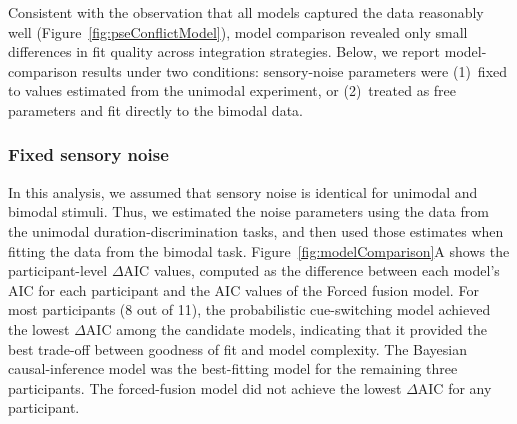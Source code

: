 \documentclass{jov}
\begin{document}



Consistent with the observation that all models captured the data reasonably well (Figure~\ref{fig:pseConflictModel}), model comparison revealed only small differences in fit quality across integration strategies. Below, we report model-comparison results under two conditions: sensory-noise parameters were (1)~fixed to values estimated from the unimodal experiment, or (2)~treated as free parameters and fit directly to the bimodal data.

\subsubsection{Fixed sensory noise}
In this analysis, we assumed that sensory noise is identical for unimodal and bimodal stimuli. Thus, we estimated the noise parameters using the data from the unimodal duration-discrimination tasks, and then used those estimates when fitting the data from the bimodal task. Figure~\ref{fig:modelComparison}A shows the participant-level $\Delta$AIC values, computed as the difference between each model's AIC for each participant and the AIC values of the Forced fusion model. For most participants (8 out of 11), the probabilistic cue-switching model achieved the lowest $\Delta$AIC among the candidate models, indicating that it provided the best trade-off between goodness of fit and model complexity. The Bayesian causal-inference model was the best-fitting model for the remaining three participants. The forced-fusion model did not achieve the lowest $\Delta$AIC for any participant.
\end{document}
